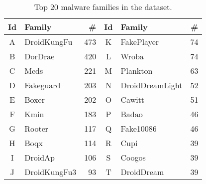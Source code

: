 \begin{table}
\centering
\begin{tabular}{clr|clr}
  \toprule
    \textbf{Id} & \textbf{Family} & \textbf{\#} & \textbf{Id} & \textbf{Family} & \textbf{\#} \\
  \midrule
  A & DroidKungFu   & 473 & K & FakePlayer      &  74 \\
  B & DorDrae       & 420 & L & Wroba           &  74 \\
  C & Meds          & 221 & M & Plankton        &  63 \\
  D & Fakeguard     & 203 & N & DroidDreamLight &  52 \\
  E & Boxer         & 202 & O & Cawitt          &  51 \\
  F & Kmin          & 183 & P & Badao           &  46 \\
  G & Rooter        & 117 & Q & Fake10086       &  46 \\
  H & Boqx          & 114 & R & Cupi            &  39 \\
  I & DroidAp       & 106 & S & Coogos          &  39 \\
  J & DroidKungFu3  &  93 & T & DroidDream      &  39 \\
  \bottomrule
\end{tabular}
\caption{Top 20 malware families in the dataset.}
\label{tab:sample1}
\end{table}


